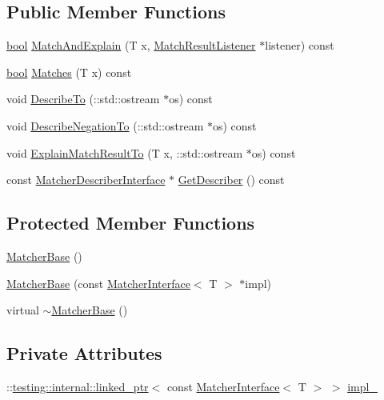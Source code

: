 \subsection*{Public Member Functions}
\begin{DoxyCompactItemize}
\item 
\hyperlink{classbool}{bool} \hyperlink{classtesting_1_1internal_1_1MatcherBase_a08429a6d7e7d330de4a4eb4e272105a7}{Match\+And\+Explain} (T x, \hyperlink{classtesting_1_1MatchResultListener}{Match\+Result\+Listener} $\ast$listener) const
\item 
\hyperlink{classbool}{bool} \hyperlink{classtesting_1_1internal_1_1MatcherBase_a3b479673ff40cac1a7d548e91d789cb2}{Matches} (T x) const
\item 
void \hyperlink{classtesting_1_1internal_1_1MatcherBase_a7e0c883c7745e0d646463077ef1c1267}{Describe\+To} (\+::std\+::ostream $\ast$os) const
\item 
void \hyperlink{classtesting_1_1internal_1_1MatcherBase_ac1089d49b6b8a381900618985cd69b7f}{Describe\+Negation\+To} (\+::std\+::ostream $\ast$os) const
\item 
void \hyperlink{classtesting_1_1internal_1_1MatcherBase_ad7815191a01d24e20eda2e0057d33aa3}{Explain\+Match\+Result\+To} (T x, \+::std\+::ostream $\ast$os) const
\item 
const \hyperlink{classtesting_1_1MatcherDescriberInterface}{Matcher\+Describer\+Interface} $\ast$ \hyperlink{classtesting_1_1internal_1_1MatcherBase_a9b816eb60ee16780703768d704c105e3}{Get\+Describer} () const
\end{DoxyCompactItemize}
\subsection*{Protected Member Functions}
\begin{DoxyCompactItemize}
\item 
\hyperlink{classtesting_1_1internal_1_1MatcherBase_a7214ff6bbe5d13d5ee01fc09c7114e1d}{Matcher\+Base} ()
\item 
\hyperlink{classtesting_1_1internal_1_1MatcherBase_aed3e080f12ea7bde535ddf02b6f66922}{Matcher\+Base} (const \hyperlink{classtesting_1_1MatcherInterface}{Matcher\+Interface}$<$ T $>$ $\ast$impl)
\item 
virtual \hyperlink{classtesting_1_1internal_1_1MatcherBase_a6f8cbfaa5fa9205f297d84fb1741d9c3}{$\sim$\+Matcher\+Base} ()
\end{DoxyCompactItemize}
\subsection*{Private Attributes}
\begin{DoxyCompactItemize}
\item 
\+::\hyperlink{classtesting_1_1internal_1_1linked__ptr}{testing\+::internal\+::linked\+\_\+ptr}$<$ const \hyperlink{classtesting_1_1MatcherInterface}{Matcher\+Interface}$<$ T $>$ $>$ \hyperlink{classtesting_1_1internal_1_1MatcherBase_ab4bf73686e35b5f033e7db82498644aa}{impl\+\_\+}
\end{DoxyCompactItemize}


